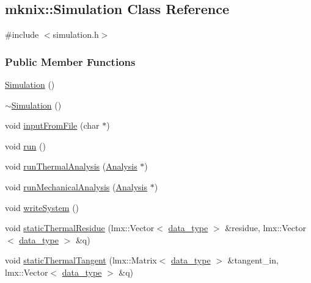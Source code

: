 \hypertarget{classmknix_1_1_simulation}{\subsection{mknix\-:\-:Simulation Class Reference}
\label{classmknix_1_1_simulation}
}


{\ttfamily \#include $<$simulation.\-h$>$}

\subsubsection*{Public Member Functions}
\begin{DoxyCompactItemize}
\item 
\hyperlink{classmknix_1_1_simulation_a8741379faa5cd9695a9dc4f9be3fdc11}{Simulation} ()
\item 
\hyperlink{classmknix_1_1_simulation_a8ab58ea5b4557c72b2a8f00cb8ef3e75}{$\sim$\-Simulation} ()
\item 
void \hyperlink{classmknix_1_1_simulation_a5ca9b93b996142dc843eba322b6f81fb}{input\-From\-File} (char $\ast$)
\item 
void \hyperlink{classmknix_1_1_simulation_a616f0712431201275269aa05eadb8779}{run} ()
\item 
void \hyperlink{classmknix_1_1_simulation_ae769b1ff16dc5eada23b3aae69da8168}{run\-Thermal\-Analysis} (\hyperlink{classmknix_1_1_analysis}{Analysis} $\ast$)
\item 
void \hyperlink{classmknix_1_1_simulation_a5b02493acba04c0dd6a1450eb2ae548a}{run\-Mechanical\-Analysis} (\hyperlink{classmknix_1_1_analysis}{Analysis} $\ast$)
\item 
void \hyperlink{classmknix_1_1_simulation_acef86e75795b95441e06f1055402a43b}{write\-System} ()
\item 
void \hyperlink{classmknix_1_1_simulation_ae86305b2478ec8fdffe9f4866f9389e2}{static\-Thermal\-Residue} (lmx\-::\-Vector$<$ \hyperlink{namespacemknix_a16be4b246fbf2cceb141e3a179111020}{data\-\_\-type} $>$ \&residue, lmx\-::\-Vector$<$ \hyperlink{namespacemknix_a16be4b246fbf2cceb141e3a179111020}{data\-\_\-type} $>$ \&q)
\item 
void \hyperlink{classmknix_1_1_simulation_a382593c555de33392bccdcbbdf244737}{static\-Thermal\-Tangent} (lmx\-::\-Matrix$<$ \hyperlink{namespacemknix_a16be4b246fbf2cceb141e3a179111020}{data\-\_\-type} $>$ \&tangent\-\_\-in, lmx\-::\-Vector$<$ \hyperlink{namespacemknix_a16be4b246fbf2cceb141e3a179111020}{data\-\_\-type} $>$ \&q)
\item 

\end{DoxyCompactItemize}
